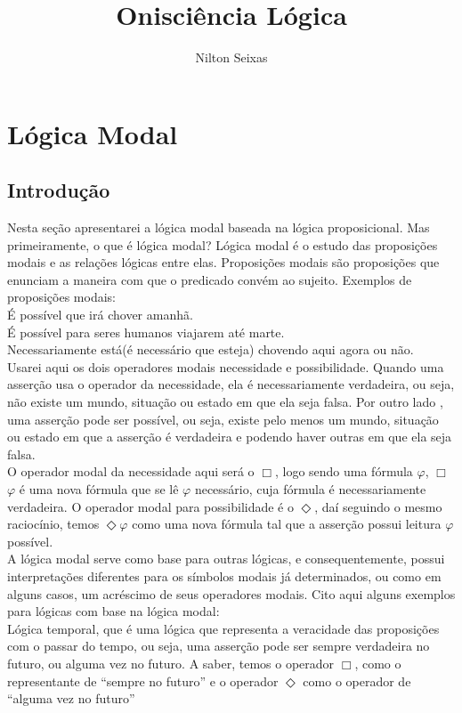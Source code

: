 \documentclass[12pt]{report}
\title{Onisciência Lógica}
\author{Nilton Seixas}
\begin{document}
\maketitle
\tableofcontents
\chapter{Lógica Modal}
  \section{Introdução}
     \hspace{0.5cm} Nesta seção apresentarei a lógica modal baseada na lógica proposicional. Mas primeiramente, o que é lógica modal? Lógica modal é o estudo das proposições modais e as relações lógicas entre elas. Proposições modais são proposições que enunciam a maneira com que o predicado convém ao sujeito. Exemplos de proposições modais:\\
	\indent É possível que irá chover amanhã.\\
	\indent É possível para seres humanos viajarem até marte.\\
	\indent Necessariamente está(é necessário que esteja) chovendo aqui agora ou não.\\
       \indent Usarei aqui os dois operadores modais necessidade e possibilidade. Quando uma asserção usa o operador da necessidade, ela é necessariamente verdadeira, ou seja, não existe um mundo, situação ou estado em que ela seja falsa. Por outro lado , uma asserção pode ser possível, ou seja, existe pelo menos um mundo,  situação ou estado em que a asserção é verdadeira e podendo haver outras em que ela seja falsa. \\
       \indent  O operador modal da necessidade aqui será o $\Box$, logo sendo uma fórmula $\varphi$, $\Box$$\varphi$ é uma nova fórmula que se lê $\varphi$ necessário, cuja fórmula é necessariamente verdadeira. O operador modal para possibilidade é o $\Diamond$, daí seguindo o mesmo raciocínio, temos $\Diamond$$\varphi$ como uma nova fórmula tal que a asserção possui leitura $\varphi$ possível.\\
     \indent A lógica modal serve como base para outras lógicas, e consequentemente, possui interpretações diferentes para os símbolos modais já determinados,  ou como em alguns casos, um acréscimo de seus operadores modais. Cito aqui alguns exemplos para lógicas com base na lógica modal:\\
         \indent Lógica temporal, que é uma lógica que representa a veracidade das proposições com o passar do tempo, ou seja, uma asserção pode ser sempre verdadeira no futuro, ou alguma vez no futuro. A saber, temos o operador $\Box$, como o representante de “sempre no futuro” e o operador $\Diamond$ como o operador de “alguma vez no futuro” \\
\end{document}
